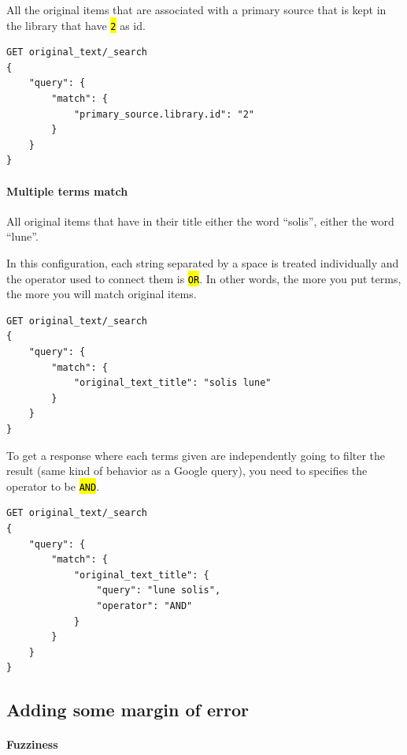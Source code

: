 \documentclass[a4paper,12pt,twoside]{book}
\let\OldTexttt\texttt
\renewcommand{\texttt}[1]{\OldTexttt{\hl{#1}}}
\let\quoteOld\quote
\let\endquoteOld\endquote
\renewenvironment{quote}{\small\quoteOld}{\endquoteOld}
\begin{document}
\begin{quote}
	All the original items that are associated with a primary source that is kept in the library that have \texttt{2} as id.
\end{quote}

\begin{lstlisting}
GET original_text/_search
{
    "query": {
        "match": {
            "primary_source.library.id": "2"
        }
    }
}
\end{lstlisting}

				\paragraph{Multiple terms match}\label{multiple-terms-match}

\begin{quote}
	All original items that have in their title either the word ``solis'', either the word ``lune''.
\end{quote}

In this configuration, each string separated by a space is treated individually and the operator used to connect them is \texttt{OR}. In other words, the more you put terms, the more you will match original items.

\begin{lstlisting}
GET original_text/_search
{
    "query": {
        "match": {
            "original_text_title": "solis lune"
        }
    }
}
\end{lstlisting}

To get a response where each terms given are independently going to filter the result (same kind of behavior as a Google query), you need to specifies the operator to be \texttt{AND}.

\begin{lstlisting}
GET original_text/_search
{
    "query": {
        "match": {
            "original_text_title": {
                "query": "lune solis",
                "operator": "AND"
            }
        }
    }
}
\end{lstlisting}

		\subsection{Adding some margin of error}\label{adding-some-margin-of-error}

				\paragraph{Fuzziness}\label{fuzziness}
\end{document}
